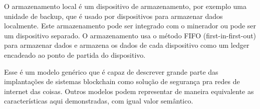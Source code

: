 O armazenamento local é um dispositivo de armazenamento, por exemplo uma unidade de backup, que é usado por dispositivos para armazenar dados localmente. Este armazenamento pode ser integrado com o minerador ou pode ser um dispositivo separado. O armazenamento usa o método FIFO (first-in-first-out) para armazenar dados e armazena os dados de cada dispositivo como um ledger encadeado ao ponto de partida do dispositivo.

Esse é um modelo genérico que é capaz de descrever grande parte das implantações de sistemas blockchain como solução de segurança pra redes de internet das coisas. Outros modelos podem representar de maneira equivalente as características aqui demonstradas, com igual valor semântico.